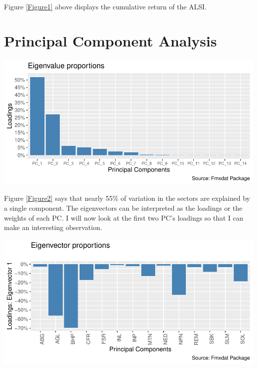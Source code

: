 \documentclass[11pt,preprint, authoryear]{elsarticle}
\let\origfigure\figure
\let\endorigfigure\endfigure
\renewenvironment{figure}[1][2] {
    \expandafter\origfigure\expandafter[H]
} {
    \endorigfigure
}
\numberwithin{equation}{section}
\numberwithin{figure}{section}
\numberwithin{table}{section}
\begin{document}
Figure \ref{Figure1} above displays the cumulative return of the ALSI.

\hypertarget{principal-component-analysis}{%
\section{\texorpdfstring{Principal Component Analysis
\label{PCA}}{Principal Component Analysis }}\label{principal-component-analysis}}

\begin{figure}[H]

{\centering \includegraphics{Question4_files/figure-latex/Figure2-1} 

}

\caption{Eigenvalue proportions \label{Figure2}}\label{fig:Figure2}
\end{figure}

Figure \ref{Figure2} says that nearly 55\% of variation in the sectors
are explained by a single component. The eigenvectors can be interpreted
as the loadings or the weights of each PC. I will now look at the first
two PC's loadings so that I can make an interesting observation.

\begin{figure}[H]

{\centering \includegraphics{Question4_files/figure-latex/Figure3-1} 

}

\caption{Eigenvector proportions \label{Figure3}}\label{fig:Figure3}
\end{figure}
\end{document}
